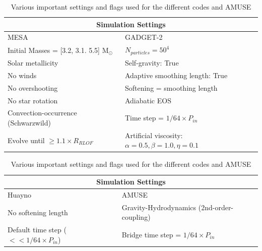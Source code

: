 \begin{table}[H]
    \centering
    \begin{tabular}{ |p{6.5cm}||p{6.5cm}|  }
     \hline
     \multicolumn{2}{|c|}{Simulation Settings} \\
     \hline
     MESA & GADGET-2 \\
     \hline
     Initial Masses = [3.2, 3.1. 5.5] M$_{\odot}$& $N_{particles}=50^4$ \\
     Solar metallicity& Self-gravity: True\\
     No winds& Adaptive smoothing length: True\\
     No overshooting& Softening = smoothing length\\
     No star rotation & Adiabatic EOS  \\
     Convection-occurrence (Schwarzwild) & Time step = $1/64 \times P_{in}$ \\
     Evolve until $\geq 1.1 \times R_{RLOF}$ & Artificial viscosity: $\alpha=0.5, \beta=1.0, \eta=0.1$ \\
     \hline
    \end{tabular}
        \centering
    \begin{tabular}{ |p{6.5cm}||p{6.5cm}|  }
     \hline
     \multicolumn{2}{|c|}{Simulation Settings} \\
     \hline
     Huayno & AMUSE \\
     \hline
     No softening length & Gravity-Hydrodynamics (2nd-order-coupling)\\
     Default time step ($<< 1/64 \times P_{in}$) &  Bridge time step = $1/64 \times P_{in}$\\
     \hline
    \end{tabular}
    \caption{ Various important settings and flags used for the different codes and AMUSE}
\label{tab:codes_settings}
\end{table}
